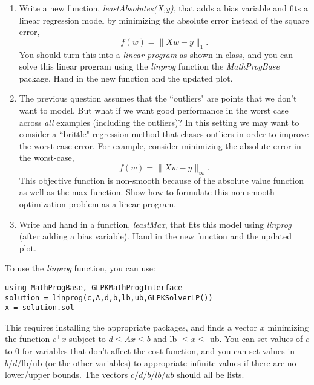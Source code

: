 \documentclass{article}
\def\blu#1{{\color{blu}#1}}
\def\norm#1{\|#1\|}
\def\enum#1{\begin{enumerate}#1\end{enumerate}}
\begin{document}
\enum{
\item
Write a new function, \emph{leastAbsolutes(X,y)}, that adds a bias variable and fits a linear regression model by minimizing the absolute error instead of the square error,
\[
f(w) = \norm{Xw- y}_1.
\]
You should turn this into a \emph{linear program} as shown in class, and you can solve this linear program using the \emph{linprog} function the \emph{MathProgBase} package. \blu{Hand in the new function and the updated plot.}
\item The previous question assumes that the ``outliers" are points that we don't want to model. But what if we want good performance in the worst case across \emph{all} examples (including the outliers)? In this setting we may want to consider a ``brittle" regression method that chases outliers in order to improve the worst-case error. For example, consider minimizing the absolute error in the worst-case,
\[
f(w) = \norm{Xw- y}_\infty.
\]
This objective function is non-smooth because of the absolute value function as well as the max function.
\blu{Show how to formulate this non-smooth optimization problem as a linear program}. 
\item Write and hand in a function, \emph{leastMax}, that fits this model using \emph{linprog} (after adding a bias variable). \blu{Hand in the new function and the updated plot.}
}
To use the \emph{linprog} function, you can  use:
\begin{verbatim}
using MathProgBase, GLPKMathProgInterface
solution = linprog(c,A,d,b,lb,ub,GLPKSolverLP())
x = solution.sol
\end{verbatim}
This requires installing the appropriate packages, and finds a vector $x$ minimizing the function $c^\top x$ subject to $d \leq Ax \leq b$ and lb $\leq x \leq $ ub. You can set values of $c$ to 0 for variables that don't affect the cost function, and you can set values in $b/d/$lb/ub (or the other variables) to appropriate infinite values if there are no lower/upper bounds. The vectors $c/d/b/lb/ub$ should all be lists.
 
\end{document}
